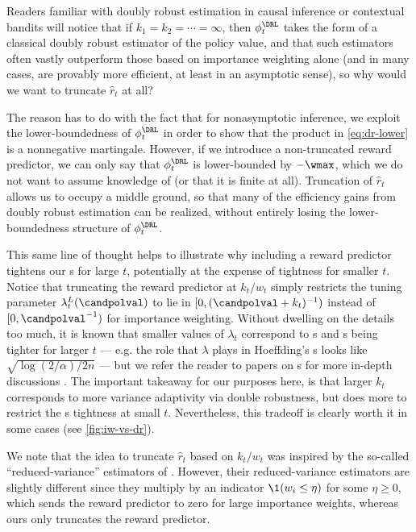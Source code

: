 \begin{remark}\label{remark:DR-why-truncate}
  Readers familiar with doubly robust estimation in causal inference or contextual bandits will notice that if $k_1 = k_2 = \cdots = \infty$, then $\phi_t^\DRL$ takes the form of a classical doubly robust estimator of the policy value, and that such estimators often vastly outperform those based on importance weighting alone (and in many cases, are provably more efficient, at least in an asymptotic sense), so why would we want to truncate $\widehat r_t$ at all?

  The reason has to do with the fact that for nonasymptotic inference, we exploit the lower-boundedness of $\phi_t^\DRL$ in order to show that the product in \eqref{eq:dr-lower} is a nonnegative martingale. However, if we introduce a non-truncated reward predictor, we can only say that $\phi_t^\DRL$ is lower-bounded by $-\wmax$, which we do not want to assume knowledge of (or that it is finite at all). Truncation of $\widehat r_t$ allows us to occupy a middle ground, so that many of the efficiency gains from doubly robust estimation can be realized, without entirely losing the lower-boundedness structure of $\phi_t^\DRL$. 

  This same line of thought helps to illustrate why including a reward predictor tightens our \cs{}s for large $t$, potentially at the expense of tightness for smaller $t$. Notice that truncating the reward predictor at $k_t / w_t$ simply restricts the tuning parameter $\lambda_t^L(\candpolval)$ to lie in $[0, (\candpolval + k_t)^{-1})$ instead of $[0, \candpolval^{-1})$ for importance weighting. Without dwelling on the details too much, it is known that smaller values of $\lambda_t$ correspond to \cs{}s and \ci{}s being tighter for larger $t$ --- e.g. the role that $\lambda$ plays in Hoeffding's \ci{}s looks like $\sqrt{\log (2/\alpha)/ 2n}$ \citep{hoeffding_probability_1963} --- but we refer the reader to papers on \cs{}s for more in-depth discussions \citep{howard2018uniform,waudby2020estimating}. The important takeaway for our purposes here, is that larger $k_t$ corresponds to more variance adaptivity via double robustness, but does more to restrict the \cs{}s tightness at small $t$. Nevertheless, this tradeoff is clearly worth it in some cases (see \cref{fig:iw-vs-dr}).
  
  We note that the idea to truncate $\widehat r_t$ based on $k_t / w_t$ was inspired by the so-called ``reduced-variance'' estimators of \citet{zimmert2019connections,zimmert2021tsallis}. However, their reduced-variance estimators are slightly different since they multiply by an indicator $\1(w_i \leq \eta)$ for some $\eta \geq 0$, which sends the reward predictor to zero for large importance weights, whereas ours only truncates the reward predictor.
\end{remark}

